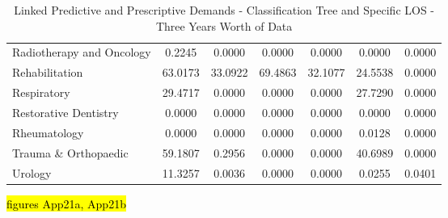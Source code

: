 \documentclass[thesis.tex]{subfiles}
\begin{document}
\begin{table}[h!]
{\begin{tabular}{lcccccc}
Radiotherapy and Oncology&	0.2245&	0.0000&	0.0000&	0.0000&	0.0000&	0.0000\\
Rehabilitation&	63.0173&	33.0922&	69.4863&	32.1077&	24.5538&	0.0000\\
Respiratory&	29.4717&	0.0000&	0.0000&	0.0000&	27.7290&	0.0000\\
Restorative Dentistry&	0.0000&	0.0000&	0.0000&	0.0000&	0.0000&	0.0000\\
Rheumatology&	0.0000&	0.0000&	0.0000&	0.0000&	0.0128&	0.0000\\
Trauma \& Orthopaedic&	59.1807&	0.2956&	0.0000&	0.0000&	40.6989&	0.0000\\
Urology&	11.3257&	0.0036&	0.0000&	0.0000&	0.0255&	0.0401\\


\bottomrule

    \end{tabular}}
    \caption{Linked Predictive and Prescriptive Demands - Classification Tree and Specific LOS - Three Years Worth of Data}
    \label{apptab:LinkedDemands9}
\end{table}

\hl{figures App21a, App21b}
\end{document}
